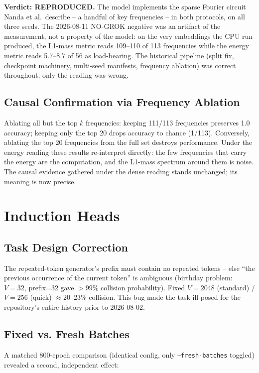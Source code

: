 \documentclass[11pt]{article}
\begin{document}
\textbf{Verdict: REPRODUCED.} The model implements the sparse Fourier circuit
Nanda et al.\ describe -- a handful of key frequencies -- in both protocols,
on all three seeds. The 2026-08-11 NO-GROK negative was an artifact of the
measurement, not a property of the model: on the very embeddings the CPU run
produced, the L1-mass metric reads 109--110 of 113 frequencies while the
energy metric reads 5.7--8.7 of 56 as load-bearing. The historical pipeline
(split fix, checkpoint machinery, multi-seed manifests, frequency ablation)
was correct throughout; only the reading was wrong.

\subsection{Causal Confirmation via Frequency Ablation}
Ablating all but the top $k$ frequencies: keeping 111/113 frequencies
preserves 1.0 accuracy; keeping only the top 20 drops accuracy to chance
(1/113). Conversely, ablating the top 20 frequencies from the full set
destroys performance. Under the energy reading these results re-interpret
directly: the few frequencies that carry the energy are the computation, and
the L1-mass spectrum around them is noise. The causal evidence gathered under
the dense reading stands unchanged; its meaning is now precise.

\section{Induction Heads}
\label{sec:induction}

\subsection{Task Design Correction}
The repeated-token generator's prefix must contain no repeated tokens --
else ``the previous occurrence of the current token'' is ambiguous (birthday
problem: $V=32$, prefix=32 gave $>99\%$ collision probability). Fixed
$V=2048$ (standard) / $V=256$ (quick) $\approx 20\text{--}23\%$
collision. This bug made the task ill-posed for the repository's entire
history prior to 2026-08-02.

\subsection{Fixed vs. Fresh Batches}
A matched 800-epoch comparison (identical config, only
\texttt{--fresh-batches} toggled) revealed a second, independent effect:
\end{document}
